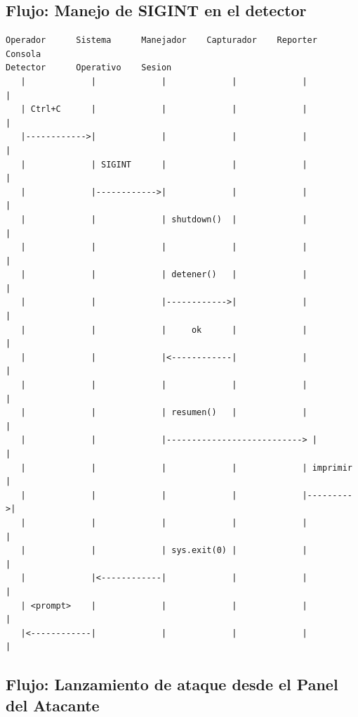 \documentclass[11pt,a4paper]{article}
\begin{document}
\subsection{Flujo: Manejo de SIGINT en el detector}

\vspace{0.3cm}
\begin{verbatim}
Operador      Sistema      Manejador    Capturador    Reporter    Consola
Detector      Operativo    Sesion
   |             |             |             |             |          |
   | Ctrl+C      |             |             |             |          |
   |------------>|             |             |             |          |
   |             | SIGINT      |             |             |          |
   |             |------------>|             |             |          |
   |             |             | shutdown()  |             |          |
   |             |             |             |             |          |
   |             |             | detener()   |             |          |
   |             |             |------------>|             |          |
   |             |             |     ok      |             |          |
   |             |             |<------------|             |          |
   |             |             |             |             |          |
   |             |             | resumen()   |             |          |
   |             |             |---------------------------> |        |
   |             |             |             |             | imprimir |
   |             |             |             |             |--------->|
   |             |             |             |             |          |
   |             |             | sys.exit(0) |             |          |
   |             |<------------|             |             |          |
   | <prompt>    |             |             |             |          |
   |<------------|             |             |             |          |
\end{verbatim}

\subsection{Flujo: Lanzamiento de ataque desde el Panel del Atacante}
\end{document}
